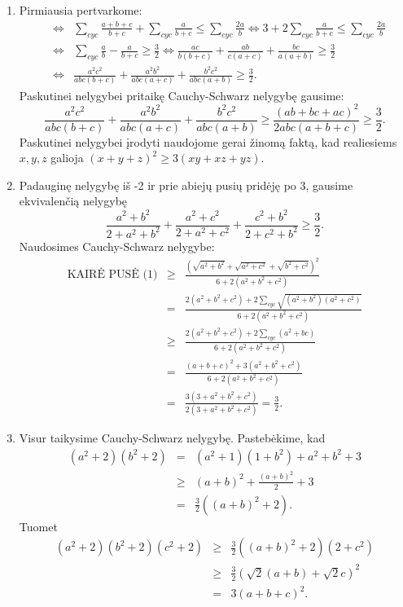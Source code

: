 \begin{enumerate}
\item
    Pirmiausia pertvarkome:
    \begin{eqnarray*}&\Leftrightarrow&\sum_{cyc}\frac{a+b+c}{b+c}+\sum_{cyc}\frac{a}{b+c}\leq\sum_{cyc}\frac{2a}{b}\Leftrightarrow3+2\sum_{cyc}\frac{a}{b+c}\leq\sum_{cyc}\frac{2a}{b}\\
    &\Leftrightarrow&\sum_{cyc}{\frac{a}{b}-\frac{a}{b+c}}\geq\frac{3}{2}\Leftrightarrow\frac{ac}{b(b+c)}+\frac{ab}{c(a+c)}+\frac{bc}{a(a+b)}\geq\frac{3}{2}\\
    &\Leftrightarrow&\frac{a^2c^2}{abc(b+c)}+\frac{a^2b^2}{abc(a+c)}+\frac{b^2c^2}{abc(a+b)}\geq\frac{3}{2}.\end{eqnarray*}
    Paskutinei nelygybei pritaikę Cauchy-Schwarz nelygybę gausime:
    $$\frac{a^2c^2}{abc(b+c)}+\frac{a^2b^2}{abc(a+c)}+\frac{b^2c^2}{abc(a+b)}\geq\frac{(ab+bc+ac)^2}{2abc(a+b+c)}\geq\frac{3}{2}.$$
    Paskutinei nelygybei įrodyti naudojome gerai žinomą faktą, kad
    realiesiems $x,y,z$ galioja $(x+y+z)^2\geq3(xy+xz+yz)$.
\item
    Padauginę nelygybę iš -2 ir prie abiejų pusių pridėję po 3, gausime
    ekvivalenčią nelygybę
    \begin{equation*}\frac{a^2+b^2}{2+a^2+b^2}+\frac{a^2+c^2}{2+a^2+c^2}+\frac{c^2+b^2}{2+c^2+b^2}\geq\frac{3}{2}.\tag{1}\end{equation*}
    Naudosimes Cauchy-Schwarz nelygybe: \begin{eqnarray*}\text{KAIRĖ PUSĖ
    (1)}&\geq&\frac{\left(\sqrt{a^2+b^2}+\sqrt{a^2+c^2}+\sqrt{b^2+c^2}\right)^2}{6+2(a^2+b^2+c^2)}\\&=&\frac{2(a^2+b^2+c^2)+2\sum\limits_{cyc}{\sqrt{(a^2+b^2)(a^2+c^2)}}}{6+2(a^2+b^2+c^2)}\\
    &\geq&\frac{2(a^2+b^2+c^2)+2\sum\limits_{cyc}{(a^2+bc)}}{6+2(a^2+b^2+c^2)}\\
    &=&\frac{(a+b+c)^2+3(a^2+b^2+c^2)}{6+2(a^2+b^2+c^2)}\\&=&\frac{3(3+a^2+b^2+c^2)}{2(3+a^2+b^2+c^2)}=\frac{3}{2}.\end{eqnarray*}
\item
    Visur taikysime Cauchy-Schwarz nelygybę. Pastebėkime, kad
    \begin{eqnarray*}
    (a^2+2)(b^2+2)&=&(a^2+1)(1+b^2)+a^2+b^2+3\\&\geq&(a+b)^2+\frac{(a+b)^2}{2}+3\\&=&\frac{3}{2}((a+b)^2+2).\end{eqnarray*}
    Tuomet
    \begin{eqnarray*}(a^2+2)(b^2+2)(c^2+2)&\geq&\frac{3}{2}((a+b)^2+2)(2+c^2)\\&\geq&\frac{3}{2}(\sqrt{2}(a+b)+\sqrt2c)^2\\&=&3(a+b+c)^2.\end{eqnarray*}
\end{enumerate} 
